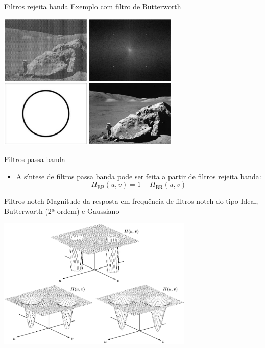 \begin{slide}{Filtros rejeita banda}
	Exemplo com filtro de Butterworth
	\begin{center}
		\includegraphics[width = 0.65\textwidth]{figs/5-16}
	\end{center}
\end{slide}


\begin{slide}{Filtros passa banda}
	\begin{itemize}
		\item A síntese de filtros passa banda pode ser feita a partir de filtros rejeita banda:
			\begin{equation*}
				H_\text{BP}(u,v) = 1-H_\text{BR}(u,v)
			\end{equation*}
	\end{itemize}
\end{slide}

\begin{slide}{Filtros notch}
	Magnitude da resposta em frequência de filtros notch do tipo Ideal, Butterworth (2ª ordem) e Gaussiano
	\begin{center}
		\includegraphics[width = 0.7\textwidth]{figs/5-18}
	\end{center}

\end{slide}

